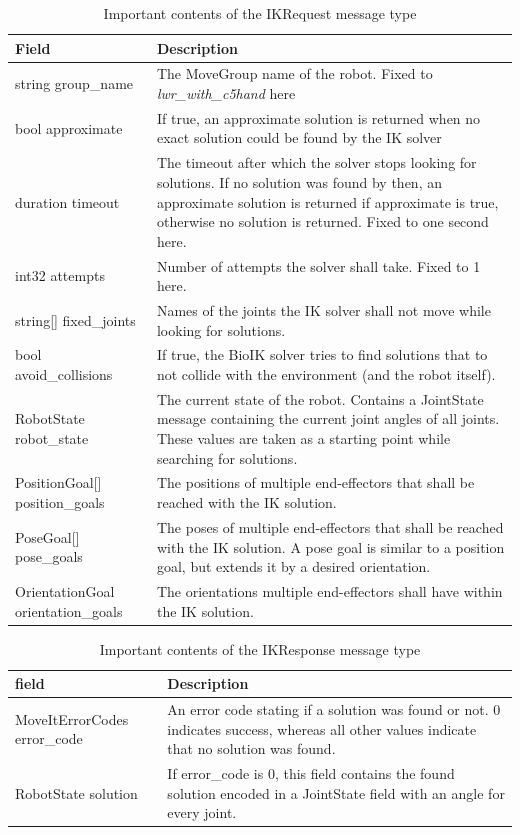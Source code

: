 \begin{table}
	\caption{Important contents of the IKRequest message type\label{tab:msg:ikrequest}}
	\begin{tabularx}{\linewidth}{|l|X|}
		\hline
		\textbf{Field} & \textbf{Description} \\
		\hline
		string group\_name & The MoveGroup name of the robot. Fixed to \textit{lwr\_with\_c5hand} here \\
		\hline
		bool approximate & If true, an approximate solution is returned when no exact solution could be found by the IK solver \\
		\hline
		duration timeout & The timeout after which the solver stops looking for solutions. If no solution was found by then, an approximate solution is returned if approximate is true, otherwise no solution is returned. Fixed to one second here. \\
		\hline
		int32 attempts & Number of attempts the solver shall take. Fixed to 1 here. \\
		\hline
		string[] fixed\_joints & Names of the joints the IK solver shall not move while looking for solutions. \\
		\hline
		bool avoid\_collisions & If true, the BioIK solver tries to find solutions that to not collide with the environment (and the robot itself). \\
		\hline
		RobotState robot\_state & The current state of the robot. Contains a JointState message containing the current joint angles of all joints. These values are taken as a starting point while searching for solutions. \\
		\hline
		PositionGoal[] position\_goals & The positions of multiple end-effectors that shall be reached with the IK solution. \\
		\hline
		PoseGoal[] pose\_goals & The poses of multiple end-effectors that shall be reached with the IK solution. A pose goal is similar to a position goal, but extends it by a desired orientation. \\
		\hline
		OrientationGoal orientation\_goals & The orientations multiple end-effectors shall have within the IK solution. \\
		\hline
	\end{tabularx}
\end{table}

\begin{table}
	\caption{Important contents of the IKResponse message type\label{tab:msg:ikresponse}}
	\begin{tabularx}{\linewidth}{|l|X|}
		\hline
		\textbf{field} & \textbf{Description} \\
		\hline
		MoveItErrorCodes error\_code & An error code stating if a solution was found or not. 0 indicates success, whereas all other values indicate that no solution was found. \\
		\hline
		RobotState solution & If error\_code is 0, this field contains the found solution encoded in a JointState field with an angle for every joint. \\
		\hline
	\end{tabularx}
\end{table}

